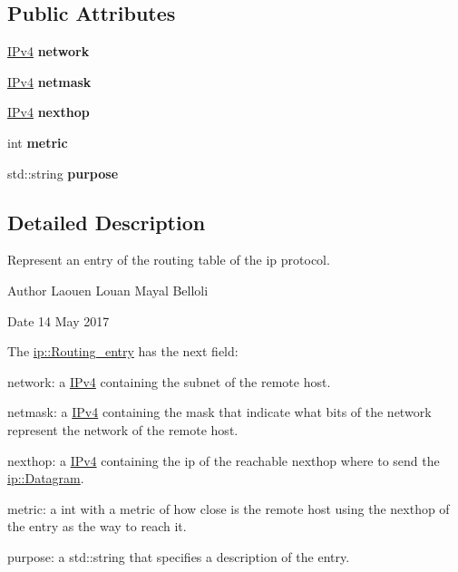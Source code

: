 \subsection*{Public Attributes}
\begin{DoxyCompactItemize}
\item 
\hyperlink{structIPv4}{I\+Pv4} {\bfseries network}\hypertarget{structip_1_1Routing__entry_a71f05d75bccb8d9c22279d7dd85ae8d4}{}\label{structip_1_1Routing__entry_a71f05d75bccb8d9c22279d7dd85ae8d4}

\item 
\hyperlink{structIPv4}{I\+Pv4} {\bfseries netmask}\hypertarget{structip_1_1Routing__entry_ada2fd8977a73fe53ba46e33d27ff2aa6}{}\label{structip_1_1Routing__entry_ada2fd8977a73fe53ba46e33d27ff2aa6}

\item 
\hyperlink{structIPv4}{I\+Pv4} {\bfseries nexthop}\hypertarget{structip_1_1Routing__entry_a0cc799eaa340a36f5ee85b0ae481a89d}{}\label{structip_1_1Routing__entry_a0cc799eaa340a36f5ee85b0ae481a89d}

\item 
int {\bfseries metric}\hypertarget{structip_1_1Routing__entry_ae1716d85035bef832f0efb163834a654}{}\label{structip_1_1Routing__entry_ae1716d85035bef832f0efb163834a654}

\item 
std\+::string {\bfseries purpose}\hypertarget{structip_1_1Routing__entry_a2ab5f00c9e3a4b2a707e236a82f9a2ce}{}\label{structip_1_1Routing__entry_a2ab5f00c9e3a4b2a707e236a82f9a2ce}

\end{DoxyCompactItemize}


\subsection{Detailed Description}
Represent an entry of the routing table of the ip protocol. 

\begin{DoxyAuthor}{Author}
Laouen Louan Mayal Belloli 
\end{DoxyAuthor}
\begin{DoxyDate}{Date}
14 May 2017
\end{DoxyDate}
The \hyperlink{structip_1_1Routing__entry}{ip\+::\+Routing\+\_\+entry} has the next field\+:
\begin{DoxyEnumerate}
\item network\+: a \hyperlink{structIPv4}{I\+Pv4} containing the subnet of the remote host.
\item netmask\+: a \hyperlink{structIPv4}{I\+Pv4} containing the mask that indicate what bits of the network represent the network of the remote host.
\item nexthop\+: a \hyperlink{structIPv4}{I\+Pv4} containing the ip of the reachable nexthop where to send the \hyperlink{structip_1_1Datagram}{ip\+::\+Datagram}.
\item metric\+: a int with a metric of how close is the remote host using the nexthop of the entry as the way to reach it.
\item purpose\+: a std\+::string that specifies a description of the entry. 
\end{DoxyEnumerate}

